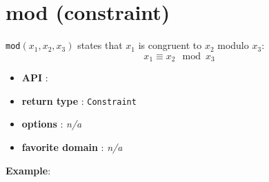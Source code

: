 \label{mod}
\hypertarget{mod}{}

\section{mod (constraint)}\label{mod:modconstraint}\hypertarget{mod:modconstraint}{}
\begin{notedef}
  \texttt{mod}$(x_1,x_2,x_3)$ states that $x_1$ is congruent to $x_2$
  modulo $x_3$:
$$x_1 \equiv x_2 \mod x_3$$
\end{notedef}
\begin{itemize}
	\item \textbf{API} : 
	\item \textbf{return type} : \texttt{Constraint}
	\item \textbf{options} : \emph{n/a}
	\item \textbf{favorite domain} : \emph{n/a}
\end{itemize}

\textbf{Example}:

